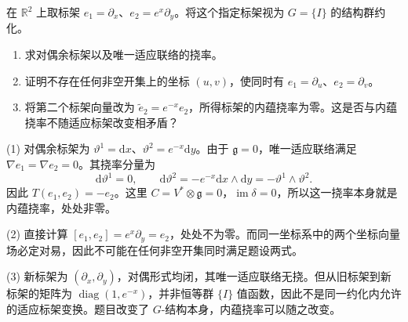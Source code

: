 \begin{exercise}
	\label{g1:ex:intrinsic-torsion-global-frame}
	在 \(\mathbb R^2\) 上取标架 \(e_1=\partial_x\)、\(e_2=e^x\partial_y\)。将这个指定标架视为 \(G=\{I\}\) 的结构群约化。
	\begin{enumerate}
		\item 求对偶余标架以及唯一适应联络的挠率。
		\item 证明不存在任何非空开集上的坐标 \((u,v)\)，使同时有 \(e_1=\partial_u\)、\(e_2=\partial_v\)。
		\item 将第二个标架向量改为 \(\widetilde e_2=e^{-x}e_2\)，所得标架的内蕴挠率为零。这是否与内蕴挠率不随适应标架改变相矛盾？
	\end{enumerate}
\end{exercise}
\begin{solution}
	(1) 对偶余标架为 \(\vartheta^1=\mathrm{d}x\)、\(\vartheta^2=e^{-x}\mathrm{d}y\)。由于 \(\mathfrak g=0\)，唯一适应联络满足 \(\nabla e_1=\nabla e_2=0\)。其挠率分量为
	\[
		\mathrm{d}\vartheta^1=0,\qquad
		\mathrm{d}\vartheta^2=-e^{-x}\mathrm{d}x\wedge\mathrm{d}y
		=-\vartheta^1\wedge\vartheta^2.
	\]
	因此 \(T(e_1,e_2)=-e_2\)。这里 \(C=V^*\otimes\mathfrak g=0\)，\(\operatorname{im}\delta=0\)，所以这一挠率本身就是内蕴挠率，处处非零。

	(2) 直接计算 \([e_1,e_2]=e^x\partial_y=e_2\)，处处不为零。而同一坐标系中的两个坐标向量场必定对易，因此不可能在任何非空开集同时满足题设两式。

	(3) 新标架为 \((\partial_x,\partial_y)\)，对偶形式均闭，其唯一适应联络无挠。但从旧标架到新标架的矩阵为 \(\operatorname{diag}(1,e^{-x})\)，并非恒等群 \(\{I\}\) 值函数，因此不是同一约化内允许的适应标架变换。题目改变了 \(G\)-结构本身，内蕴挠率可以随之改变。
\end{solution}

